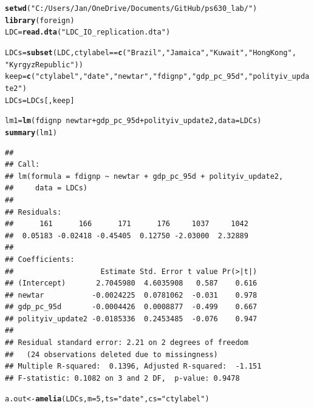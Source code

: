\documentclass[12pt]{article}\usepackage[]{graphicx}\usepackage[]{color}
\makeatletter
\newcommand{\hlnum}[1]{\textcolor[rgb]{0.686,0.059,0.569}{#1}}%
\newcommand{\hlstr}[1]{\textcolor[rgb]{0.192,0.494,0.8}{#1}}%
\newcommand{\hlopt}[1]{\textcolor[rgb]{0,0,0}{#1}}%
\newcommand{\hlstd}[1]{\textcolor[rgb]{0.345,0.345,0.345}{#1}}%
\newcommand{\hlkwb}[1]{\textcolor[rgb]{0.69,0.353,0.396}{#1}}%
\newcommand{\hlkwc}[1]{\textcolor[rgb]{0.333,0.667,0.333}{#1}}%
\newcommand{\hlkwd}[1]{\textcolor[rgb]{0.737,0.353,0.396}{\textbf{#1}}}%
\newenvironment{kframe}{%
 \def\at@end@of@kframe{}%
 \ifinner\ifhmode%
  \def\at@end@of@kframe{\end{minipage}}%
  \begin{minipage}{\columnwidth}%
 \fi\fi%
 \def\FrameCommand##1{\hskip\@totalleftmargin \hskip-\fboxsep
 \colorbox{shadecolor}{##1}\hskip-\fboxsep
     \hskip-\linewidth \hskip-\@totalleftmargin \hskip\columnwidth}%
 \MakeFramed {\advance\hsize-\width
   \@totalleftmargin\z@ \linewidth\hsize
   \@setminipage}}%
 {\par\unskip\endMakeFramed%
 \at@end@of@kframe}
\newenvironment{knitrout}{}{} %
\makeatother
\begin{document}
\begin{knitrout}
\color{fgcolor}\begin{kframe}
\begin{alltt}
\hlkwd{setwd}\hlstd{(}\hlstr{"C:/Users/Jan/OneDrive/Documents/GitHub/ps630_lab/"}\hlstd{)}
\hlkwd{library}\hlstd{(foreign)}
\hlstd{LDC} \hlkwb{=} \hlkwd{read.dta}\hlstd{(}\hlstr{"LDC_IO_replication.dta"}\hlstd{)}

\hlstd{LDCs} \hlkwb{=} \hlkwd{subset}\hlstd{(LDC, ctylabel} \hlopt{==} \hlkwd{c}\hlstd{(}\hlstr{"Brazil"}\hlstd{,} \hlstr{"Jamaica"}\hlstd{,} \hlstr{"Kuwait"}\hlstd{,} \hlstr{"HongKong"}\hlstd{,}
    \hlstr{"KyrgyzRepublic"}\hlstd{))}
\hlstd{keep} \hlkwb{=} \hlkwd{c}\hlstd{(}\hlstr{"ctylabel"}\hlstd{,} \hlstr{"date"}\hlstd{,} \hlstr{"newtar"}\hlstd{,} \hlstr{"fdignp"}\hlstd{,} \hlstr{"gdp_pc_95d"}\hlstd{,} \hlstr{"polityiv_update2"}\hlstd{)}
\hlstd{LDCs} \hlkwb{=} \hlstd{LDCs[, keep]}

\hlstd{lm1} \hlkwb{=} \hlkwd{lm}\hlstd{(fdignp} \hlopt{~} \hlstd{newtar} \hlopt{+} \hlstd{gdp_pc_95d} \hlopt{+} \hlstd{polityiv_update2,} \hlkwc{data} \hlstd{= LDCs)}
\hlkwd{summary}\hlstd{(lm1)}
\end{alltt}
\begin{verbatim}
## 
## Call:
## lm(formula = fdignp ~ newtar + gdp_pc_95d + polityiv_update2, 
##     data = LDCs)
## 
## Residuals:
##      161      166      171      176     1037     1042 
##  0.05183 -0.02418 -0.45405  0.12750 -2.03000  2.32889 
## 
## Coefficients:
##                    Estimate Std. Error t value Pr(>|t|)
## (Intercept)       2.7045980  4.6035908   0.587    0.616
## newtar           -0.0024225  0.0781062  -0.031    0.978
## gdp_pc_95d       -0.0004426  0.0008877  -0.499    0.667
## polityiv_update2 -0.0185336  0.2453485  -0.076    0.947
## 
## Residual standard error: 2.21 on 2 degrees of freedom
##   (24 observations deleted due to missingness)
## Multiple R-squared:  0.1396,	Adjusted R-squared:  -1.151 
## F-statistic: 0.1082 on 3 and 2 DF,  p-value: 0.9478
\end{verbatim}
\end{kframe}
\end{knitrout}



\begin{knitrout}
\color{fgcolor}\begin{kframe}
\begin{alltt}
\hlstd{a.out} \hlkwb{<-} \hlkwd{amelia}\hlstd{(LDCs,} \hlkwc{m} \hlstd{=} \hlnum{5}\hlstd{,} \hlkwc{ts} \hlstd{=} \hlstr{"date"}\hlstd{,} \hlkwc{cs} \hlstd{=} \hlstr{"ctylabel"}\hlstd{)}
\end{alltt}
\end{kframe}
\end{knitrout}
\end{document}
